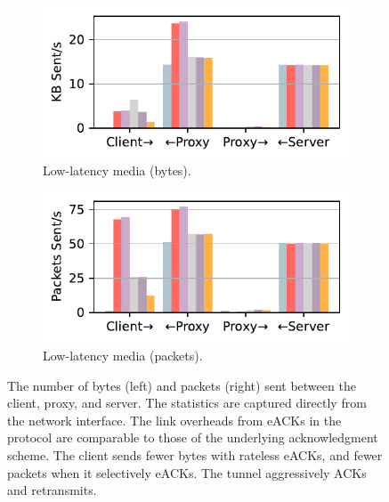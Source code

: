 \begin{figure}[ht]
\begin{minipage}[t]{0.68\textwidth}
    \begin{subfigure}[b]{0.49\linewidth}
        \centering
        \includegraphics[width=\linewidth]{figures/network_stats_media_tx_bytes.pdf}
        \caption{Low-latency media (bytes).}
        \label{fig:link-overheads:media-bytes}
    \end{subfigure}
    \begin{subfigure}[b]{0.49\linewidth}
        \centering
        \includegraphics[width=\linewidth]{figures/network_stats_media_tx_packets.pdf}
        \caption{Low-latency media (packets).}
        \label{fig:link-overheads:media-packets}
    \end{subfigure}
    
    \caption{The number of bytes (left) and packets (right) sent between the
     client, proxy, and server. The statistics are captured directly from the
     network interface. The link overheads from eACKs in the \Sys protocol are
     comparable to those of the underlying acknowledgment scheme. The client
     sends fewer bytes with rateless eACKs, and fewer packets when it
     selectively eACKs. The tunnel aggressively ACKs and retransmits.}
    \label{fig:link-overheads}
\end{minipage}
\end{figure}